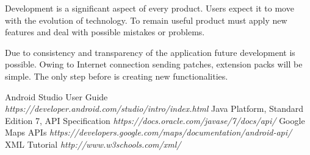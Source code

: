 \documentclass[12pt]{article}
\begin{document}
Development is a significant aspect of every product.
Users expect it to move with the evolution of technology.
To remain useful product must apply new features and deal with possible mistakes or problems.

Due to consistency and transparency of the application future development is possible.
Owing to Internet connection sending patches, extension packs will be simple.
The only step before is creating new functionalities.

\newpage
\listoffigures

\newpage
\begin{thebibliography}{9}
Android Studio User Guide
\textit {https://developer.android.com/studio/intro/index.html}
Java Platform, Standard Edition 7, API Specification
\textit {https://docs.oracle.com/javase/7/docs/api/}
Google Maps APIs
\textit {https://developers.google.com/maps/documentation/android-api/}
XML Tutorial
\textit {http://www.w3schools.com/xml/}


\end{thebibliography}
\end{document}
